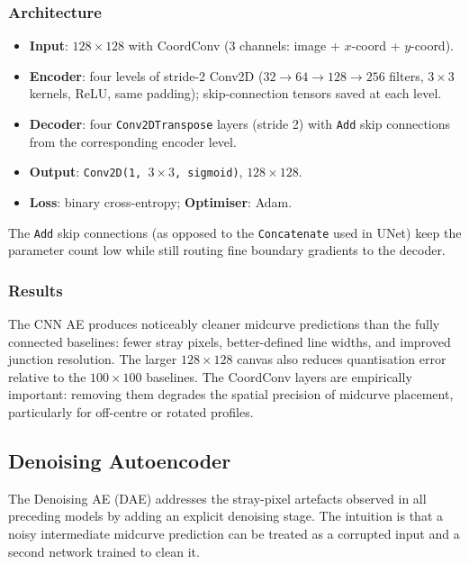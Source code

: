 \documentclass[journal]{IEEEtran}
\begin{document}
\subsubsection{Architecture}

\begin{itemize}
  \item \textbf{Input}: $128 \times 128$ with CoordConv (3 channels: image +
        $x$-coord + $y$-coord).
  \item \textbf{Encoder}: four levels of stride-2 Conv2D
        ($32 \to 64 \to 128 \to 256$ filters, $3\times3$ kernels, ReLU,
        same padding); skip-connection tensors saved at each level.
  \item \textbf{Decoder}: four \texttt{Conv2DTranspose} layers (stride 2) with
        \texttt{Add} skip connections from the corresponding encoder level.
  \item \textbf{Output}: \texttt{Conv2D(1, $3\times3$, sigmoid)},
        $128 \times 128$.
  \item \textbf{Loss}: binary cross-entropy; \textbf{Optimiser}: Adam.
\end{itemize}

The \texttt{Add} skip connections (as opposed to the \texttt{Concatenate} used
in UNet) keep the parameter count low while still routing fine boundary
gradients to the decoder.

\subsubsection{Results}

The CNN AE produces noticeably cleaner midcurve predictions than the fully
connected baselines: fewer stray pixels, better-defined line widths, and
improved junction resolution.  The larger $128 \times 128$ canvas also
reduces quantisation error relative to the $100 \times 100$ baselines.
The CoordConv layers are empirically important: removing them degrades the
spatial precision of midcurve placement, particularly for off-centre or
rotated profiles.

\subsection{Denoising Autoencoder}
\label{sec:denoising_ae}

The Denoising AE (DAE) addresses the stray-pixel artefacts observed in all
preceding models by adding an explicit denoising stage.  The intuition is that
a noisy intermediate midcurve prediction can be treated as a corrupted input
and a second network trained to clean it.
\end{document}
